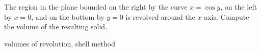 \documentclass{article}
\begin{document}
\begin{question}[2018.S.7]  %
The region in the plane bounded on the right by the curve $x = \cos y$, on the left by $x=0$, and on the bottom by $y = 0$ is revolved around the $x$-axis. Compute the volume of the resulting solid.  
\begin{multiplechoice} 
 \choicebreak %
\end{multiplechoice}
\begin{keywords}volumes of revolution, shell method\end{keywords}
\end{question}


\scratchbreak  %
\end{document}
